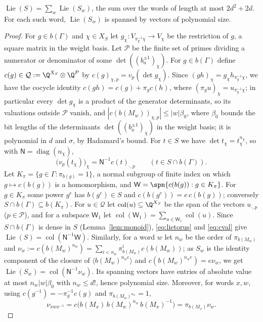 \begin{lemma}\label{lem:torus}
$\operatorname{Lie}(S)=\sum_w\operatorname{Lie}(S_w)$, the sum over the words of length at most $2d^2+2d$. For each such
word, $\operatorname{Lie}(S_w)$ is spanned by vectors of polynomial size.
\end{lemma}
\begin{proof}
For $g\in b(\Gamma)$ and $\chi\in X_S$ let $g_\chi:V_{\pi_g^{-1}\chi}\to V_\chi$ be the restriction
of $g$, a square matrix in the weight basis. Let $\mathcal P$ be the finite set of primes dividing a
numerator or denominator of some $\det((b_a^{\pm1})_\chi)$. For $g\in b(\Gamma)$ define
$c(g)\in\mathcal Q:=\Q^{X_S}\otimes\Q^{\mathcal P}$ by $c(g)_{\chi,p}=v_p(\det g_\chi)$. Since
$(gh)_\chi=g_\chi h_{\pi_g^{-1}\chi}$, we have the cocycle identity $c(gh)=c(g)+\pi_gc(h)$, where
$(\pi_gu)_\chi=u_{\pi_g^{-1}\chi}$; in particular every $\det g_\chi$ is a product of the generator
determinants, so its valuations outside $\mathcal P$ vanish, and $|c(b(M_w))_{\chi,p}|\le|w|\beta_0$, where
$\beta_0$ bounds the bit lengths of the determinants $\det((b_a^{\pm1})_\chi)$ in the weight basis; it is
polynomial in $d$ and $\sigma$, by Hadamard's bound. For
$t\in S$ we have $\det t_\chi=t_\chi^{n_\chi}$, so with $\mathsf N=\operatorname{diag}(n_\chi)$,
\begin{equation}\label{eq:cval}
\bigl(v_p(t_\chi)\bigr)_\chi=\mathsf N^{-1}c(t)_{\cdot,p}\qquad(t\in S\cap b(\Gamma)).
\end{equation}
Let $K_\pi=\{g\in\Gamma:\pi_{b(g)}=1\}$, a normal subgroup of finite index on which $g\mapsto c(b(g))$ is
a homomorphism, and $\mathsf W=\spn\{c(b(g)):g\in K_\pi\}$. For $g\in K_\pi$ some power $g^e$ has $b(g^e)\in S$ and
$c(b(g^e))=e\,c(b(g))$; conversely $S\cap b(\Gamma)\subseteq b(K_\pi)$. For $u\in\mathcal Q$ let
$\operatorname{col}(u)\subseteq\Q^{X_S}$ be the span of the vectors $u_{\cdot,p}$ ($p\in\mathcal P$), and for a
subspace $\mathsf W_1$ let $\operatorname{col}(\mathsf W_1)=\sum_{u\in\mathsf W_1}\operatorname{col}(u)$. Since $S\cap b(\Gamma)$ is dense in $S$
(Lemma~\ref{lem:monoid}), \eqref{eq:lietorus} and \eqref{eq:cval} give
$\operatorname{Lie}(S)=\operatorname{col}(\mathsf N^{-1}\mathsf W)$. Similarly, for a word $w$ let $n_w$ be the order of
$\pi_{b(M_w)}$ and $\nu_w:=c(b(M_w)^{n_w})=\sum_{i<n_w}\pi_{b(M_w)}^ic(b(M_w))$; as
$S_w$ is the identity component of the closure of $\langle b(M_w)^{n_we}\rangle$ and
$c(b(M_w)^{n_we})=e\nu_w$, we get $\operatorname{Lie}(S_w)=\operatorname{col}(\mathsf N^{-1}\nu_w)$. Its spanning vectors
have entries of absolute value at most $n_w|w|\beta_0$ with $n_w\le d!$, hence polynomial size. Moreover, for
words $x,w$, using $c(g^{-1})=-\pi_g^{-1}c(g)$ and $\pi_{b(M_w)^{n_w}}=1$,
\begin{equation}\label{eq:conjnu}
\nu_{xwx^{-1}}=c\bigl(b(M_x)\,b(M_w)^{n_w}\,b(M_x)^{-1}\bigr)=\pi_{b(M_x)}\nu_w .
\end{equation}


\end{proof}
